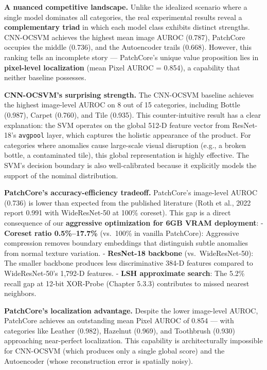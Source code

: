 \documentclass[12pt, a4paper, oneside]{report}
\begin{document}
\textbf{A nuanced competitive landscape.} Unlike the idealized scenario where a single model dominates all categories, the real experimental results reveal a \textbf{complementary triad} in which each model class exhibits distinct strengths. CNN-OCSVM achieves the highest mean image AUROC (0.787), PatchCore occupies the middle (0.736), and the Autoencoder trails (0.668). However, this ranking tells an incomplete story --- PatchCore's unique value proposition lies in \textbf{pixel-level localization} (mean Pixel AUROC = 0.854), a capability that neither baseline possesses.

\textbf{CNN-OCSVM's surprising strength.} The CNN-OCSVM baseline achieves the highest image-level AUROC on 8 out of 15 categories, including Bottle (0.987), Carpet (0.760), and Tile (0.935). This counter-intuitive result has a clear explanation: the SVM operates on the global 512-D feature vector from ResNet-18's \texttt{avgpool} layer, which captures the holistic appearance of the product. For categories where anomalies cause large-scale visual disruption (e.g., a broken bottle, a contaminated tile), this global representation is highly effective. The SVM's decision boundary is also well-calibrated because it explicitly models the support of the nominal distribution.

\textbf{PatchCore's accuracy-efficiency tradeoff.} PatchCore's image-level AUROC (0.736) is lower than expected from the published literature (Roth et al., 2022 report 0.991 with WideResNet-50 at 100\% coreset). This gap is a direct consequence of our \textbf{aggressive optimization for 6GB VRAM deployment}: - \textbf{Coreset ratio 0.5\%--17.7\%} (vs.~100\% in vanilla PatchCore): Aggressive compression removes boundary embeddings that distinguish subtle anomalies from normal texture variation. - \textbf{ResNet-18 backbone} (vs.~WideResNet-50): The smaller backbone produces less discriminative 384-D features compared to WideResNet-50's 1,792-D features. - \textbf{LSH approximate search}: The 5.2\% recall gap at 12-bit XOR-Probe (Chapter 5.3.3) contributes to missed nearest neighbors.

\textbf{PatchCore's localization advantage.} Despite the lower image-level AUROC, PatchCore achieves an outstanding mean Pixel AUROC of 0.854 --- with categories like Leather (0.982), Hazelnut (0.969), and Toothbrush (0.930) approaching near-perfect localization. This capability is architecturally impossible for CNN-OCSVM (which produces only a single global score) and the Autoencoder (whose reconstruction error is spatially noisy).
\end{document}
